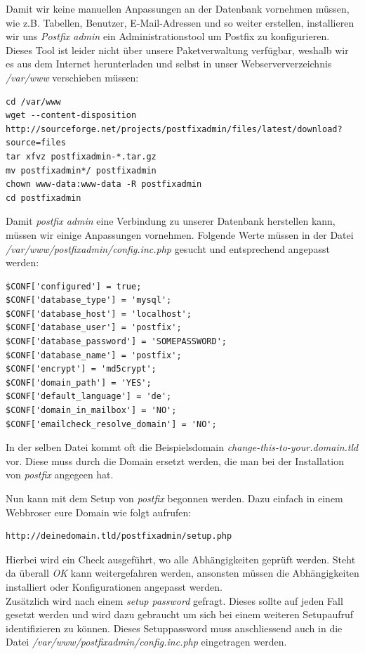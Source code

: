 Damit wir keine manuellen Anpassungen an der Datenbank vornehmen müssen, wie z.B. Tabellen, Benutzer, E-Mail-Adressen und so weiter erstellen, installieren wir uns \textit{Postfix admin} ein Administrationstool um Postfix zu konfigurieren. \\

Dieses Tool ist leider nicht über unsere Paketverwaltung verfügbar, weshalb wir es aus dem Internet herunterladen und selbst in unser Webserververzeichnis \textit{/var/www} verschieben müssen:

\begin{lstlisting}
cd /var/www
wget --content-disposition http://sourceforge.net/projects/postfixadmin/files/latest/download?source=files
tar xfvz postfixadmin-*.tar.gz
mv postfixadmin*/ postfixadmin
chown www-data:www-data -R postfixadmin
cd postfixadmin
\end{lstlisting}

Damit \textit{postfix admin} eine Verbindung zu unserer Datenbank herstellen kann, müssen wir einige Anpassungen vornehmen. Folgende Werte müssen in der Datei \textit{/var/www/postfixadmin/config.inc.php} gesucht und entsprechend angepasst werden:

\begin{lstlisting}
$CONF['configured'] = true;
$CONF['database_type'] = 'mysql';
$CONF['database_host'] = 'localhost';
$CONF['database_user'] = 'postfix';
$CONF['database_password'] = 'SOMEPASSWORD';
$CONF['database_name'] = 'postfix';
$CONF['encrypt'] = 'md5crypt';
$CONF['domain_path'] = 'YES';
$CONF['default_language'] = 'de';
$CONF['domain_in_mailbox'] = 'NO';
$CONF['emailcheck_resolve_domain'] = 'NO';
\end{lstlisting}

In der selben Datei kommt oft die Beispielsdomain \textit{change-this-to-your.domain.tld} vor. Diese muss durch die Domain ersetzt werden, die man bei der Installation von \textit{postfix} angegeen hat.

Nun kann mit dem Setup von \textit{postfix} begonnen werden. Dazu einfach in einem Webbroser eure Domain wie folgt aufrufen:

\begin{lstlisting}
http://deinedomain.tld/postfixadmin/setup.php
\end{lstlisting}

Hierbei wird ein Check ausgeführt, wo alle Abhängigkeiten geprüft werden. Steht da überall \textit{OK} kann weitergefahren werden, ansonsten müssen die Abhängigkeiten installiert oder Konfigurationen angepasst werden. \\
Zusätzlich wird nach einem \textit{setup password} gefragt. Dieses sollte auf jeden Fall gesetzt werden und wird dazu gebraucht um sich bei einem weiteren Setupaufruf identifizieren zu können.
Dieses Setuppassword muss anschliessend auch in die Datei \textit{/var/www/postfixadmin/config.inc.php} eingetragen werden.

